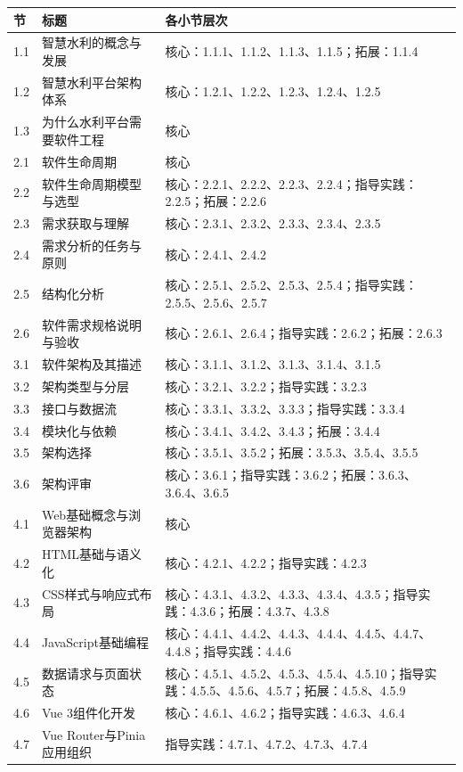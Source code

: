 \begin{longtable}{p{1.2cm}p{4.6cm}p{8.0cm}}
\toprule
节 & 标题 & 各小节层次 \\
\midrule
1.1 & 智慧水利的概念与发展 & 核心：1.1.1、1.1.2、1.1.3、1.1.5；拓展：1.1.4 \\
1.2 & 智慧水利平台架构体系 & 核心：1.2.1、1.2.2、1.2.3、1.2.4、1.2.5 \\
1.3 & 为什么水利平台需要软件工程 & 核心 \\
2.1 & 软件生命周期 & 核心 \\
2.2 & 软件生命周期模型与选型 & 核心：2.2.1、2.2.2、2.2.3、2.2.4；指导实践：2.2.5；拓展：2.2.6 \\
2.3 & 需求获取与理解 & 核心：2.3.1、2.3.2、2.3.3、2.3.4、2.3.5 \\
2.4 & 需求分析的任务与原则 & 核心：2.4.1、2.4.2 \\
2.5 & 结构化分析 & 核心：2.5.1、2.5.2、2.5.3、2.5.4；指导实践：2.5.5、2.5.6、2.5.7 \\
2.6 & 软件需求规格说明与验收 & 核心：2.6.1、2.6.4；指导实践：2.6.2；拓展：2.6.3 \\
3.1 & 软件架构及其描述 & 核心：3.1.1、3.1.2、3.1.3、3.1.4、3.1.5 \\
3.2 & 架构类型与分层 & 核心：3.2.1、3.2.2；指导实践：3.2.3 \\
3.3 & 接口与数据流 & 核心：3.3.1、3.3.2、3.3.3；指导实践：3.3.4 \\
3.4 & 模块化与依赖 & 核心：3.4.1、3.4.2、3.4.3；拓展：3.4.4 \\
3.5 & 架构选择 & 核心：3.5.1、3.5.2；拓展：3.5.3、3.5.4、3.5.5 \\
3.6 & 架构评审 & 核心：3.6.1；指导实践：3.6.2；拓展：3.6.3、3.6.4、3.6.5 \\
4.1 & Web基础概念与浏览器架构 & 核心 \\
4.2 & HTML基础与语义化 & 核心：4.2.1、4.2.2；指导实践：4.2.3 \\
4.3 & CSS样式与响应式布局 & 核心：4.3.1、4.3.2、4.3.3、4.3.4、4.3.5；指导实践：4.3.6；拓展：4.3.7、4.3.8 \\
4.4 & JavaScript基础编程 & 核心：4.4.1、4.4.2、4.4.3、4.4.4、4.4.5、4.4.7、4.4.8；指导实践：4.4.6 \\
4.5 & 数据请求与页面状态 & 核心：4.5.1、4.5.2、4.5.3、4.5.4、4.5.10；指导实践：4.5.5、4.5.6、4.5.7；拓展：4.5.8、4.5.9 \\
4.6 & Vue 3组件化开发 & 核心：4.6.1、4.6.2；指导实践：4.6.3、4.6.4 \\
4.7 & Vue Router与Pinia应用组织 & 指导实践：4.7.1、4.7.2、4.7.3、4.7.4 \\

\end{longtable}
